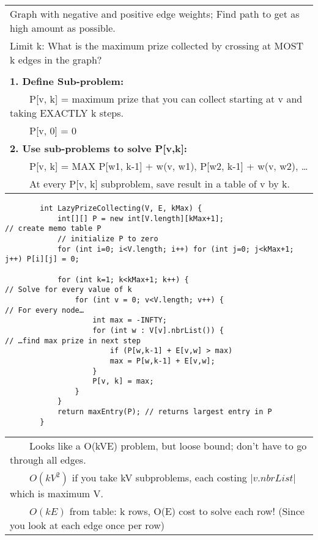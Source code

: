 \documentclass{article}
\newcommand{\tabitem}{~~\llap{\textbullet}~~}
\begin{document}
    \begin{tabular}{l}
        Graph with negative and positive edge weights; Find path to get as high amount as possible.\\
        Limit k: What is the maximum prize collected by crossing at MOST k edges in the graph?\\\\
        \textbf{1. Define Sub-problem:} \\
        \tabitem P[v, k] = maximum prize that you can collect starting at v and taking EXACTLY k steps.\\
        \tabitem P[v, 0] = 0 \\
        \textbf{2. Use sub-problems to solve P[v,k]:}\\
        \tabitem P[v, k] = MAX { P[w1, k-1] + w(v, w1), P[w2, k-1] + w(v, w2), … }\\
        \tabitem At every P[v, k] subproblem, save result in a table of v by k.\\
    \end{tabular}

    \begin{verbatim}
        int LazyPrizeCollecting(V, E, kMax) {
            int[][] P = new int[V.length][kMax+1];                     // create memo table P
            // initialize P to zero
            for (int i=0; i<V.length; i++) for (int j=0; j<kMax+1; j++) P[i][j] = 0;    
        
            for (int k=1; k<kMax+1; k++) {                             // Solve for every value of k
                for (int v = 0; v<V.length; v++) {                     // For every node…
                    int max = -INFTY;
                    for (int w : V[v].nbrList()) {                     // …find max prize in next step
                        if (P[w,k-1] + E[v,w] > max)
                        max = P[w,k-1] + E[v,w];
                    }
                    P[v, k] = max;
                }
            }
            return maxEntry(P); // returns largest entry in P
        }
    \end{verbatim}


    \begin{tabular}{l}
        \tabitem Looks like a O(kVE) problem, but loose bound; don't have to go through all edges.\\
        \tabitem $O(kV^{2})$ if you take kV subproblems, each costing $|v.nbrList|$ which is maximum V.\\
        \tabitem $O(kE)$ from table: k rows, O(E) cost to solve each row! (Since you look at each edge once per row)\\
    \end{tabular}
\end{document}
